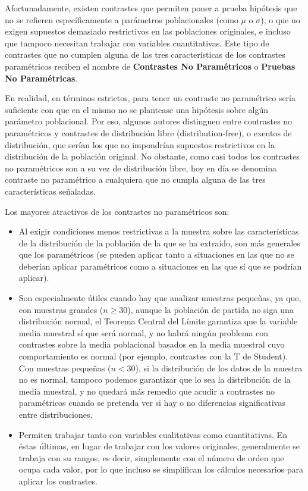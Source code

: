 Afortunadamente, existen contrastes que permiten poner a prueba hipótesis que no se refieren específicamente a parámetros poblacionales (como $\mu$ o $\sigma$), o que no exigen supuestos demasiado restrictivos en las poblaciones originales, e incluso que tampoco necesitan trabajar con variables cuantitativas. Este tipo de contrastes que no cumplen alguna de las tres características de los contrastes paramétricos reciben el nombre de \textbf{Contrastes No Paramétricos} o \textbf{Pruebas No Paramétricas}.

En realidad, en términos estrictos, para tener un contraste no paramétrico sería suficiente con que en el mismo no se plantease una hipótesis sobre algún parámetro poblacional. Por eso, algunos autores distinguen entre contrastes no paramétricos y contrastes de distribución libre (distribution-free), o exentos de distribución, que serían los que no impondrían supuestos restrictivos en la distribución de la población original. No obstante, como casi todos los contrastes no paramétricos son a su vez de distribución libre, hoy en día se denomina contraste no paramétrico a cualquiera que no cumpla alguna de las tres características señaladas.

Los mayores atractivos de los contrastes no paramétricos son:

\begin{itemize}
\item	Al exigir condiciones menos restrictivas a la muestra sobre las características de la distribución de la población de la que se ha extraído, son más generales que los paramétricos (se pueden aplicar tanto a situaciones en las que no se deberían aplicar paramétricos como a situaciones en las que sí que se podrían aplicar).
\item	Son especialmente útiles cuando hay que analizar muestras pequeñas, ya que, con muestras grandes ($n\geq 30$), aunque la población de partida no siga una distribución normal, el Teorema Central del Límite garantiza que la variable media muestral sí que será normal, y no habrá ningún problema con contrastes sobre la media poblacional basados en la media muestral cuyo comportamiento es normal (por ejemplo, contrastes con la T de Student). Con muestras pequeñas ($n<30$), si la distribución de los datos de la muestra no es normal, tampoco podemos garantizar que lo sea la distribución de la media muestral, y no quedará más remedio que acudir a contrastes no paramétricos cuando se pretenda ver si hay o no diferencias significativas entre distribuciones.
\item  Permiten trabajar tanto con variables cualitativas como cuantitativas. En éstas últimas, en lugar de trabajar con los valores originales, generalmente se trabaja con su rangos, es decir, simplemente con el número de orden que ocupa cada valor, por lo que incluso se simplifican los cálculos necesarios para aplicar los contrastes.
\end{itemize}

